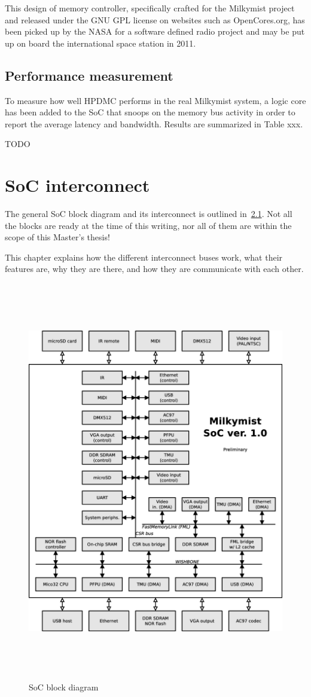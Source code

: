 \documentclass[a4paper,11pt]{kthesis}
\begin{document}
This design of memory controller, specifically crafted for the Milkymist project and released under the GNU GPL license on websites such as OpenCores.org, has been picked up by the NASA for a software defined radio project and may be put up on board the international space station in 2011.

\section{Performance measurement}
To measure how well HPDMC performs in the real Milkymist system, a logic core has been added to the SoC that snoops on the memory bus activity in order to report the average latency and bandwidth. Results are summarized in Table xxx.

TODO

\chapter{SoC interconnect}
The general SoC block diagram and its interconnect is outlined in~\ref{fig:block}. Not all the blocks are ready at the time of this writing, nor all of them are within the scope of this Master's thesis!

This chapter explains how the different interconnect buses work, what their features are, why they are there, and how they are communicate with each other.

\begin{figure}
\centering
\includegraphics[height=175mm]{soc_architecture.eps}
\caption{SoC block diagram}
\label{fig:block}
\end{figure}
\end{document}
